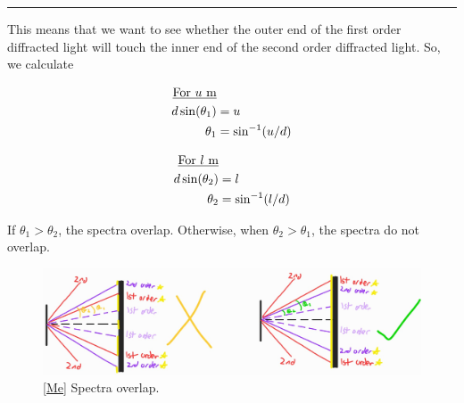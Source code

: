 \documentclass[oneside]{book}
\begin{document}
\begin{itemize}
\begin{example}{}{}
        \rule{20cm-137.0549pt-25pt}{0.05mm}
        This means that we want to see whether the outer end of the first order diffracted light will touch the inner end of the second order diffracted light. So, we calculate\vspace{-1em}
        \begin{center}
            \begin{minipage}{0.25\textwidth}
                    \begin{align*}
                        \text{\underline{For \(u\) m}}&\\
                        d\sin(\theta_1)&=u\\
                        \theta_1&=\sin^{-1}(u/d)
                    \end{align*}
            \end{minipage}\hspace{2cm}
            \begin{minipage}{0.25\textwidth}
                    \begin{align*}
                        \text{\underline{For \(l\) m}}&\\
                        d\sin(\theta_2)&=l\\
                        \theta_2&=\sin^{-1}(l/d)
                    \end{align*}
            \end{minipage}
        \end{center}
        If \(\theta_1>\theta_2\), the spectra overlap. Otherwise, when \(\theta_2>\theta_1\), the spectra do not overlap.
        \begin{figure}[H]
            \centering
            \includegraphics[width=\textwidth]{../images/spectra-overlap.jpg}
            \caption{\ref{Me} Spectra overlap.}
            \label{fig:spectra-overlap}
        \end{figure}
    \end{example}
\end{itemize}
\end{document}
